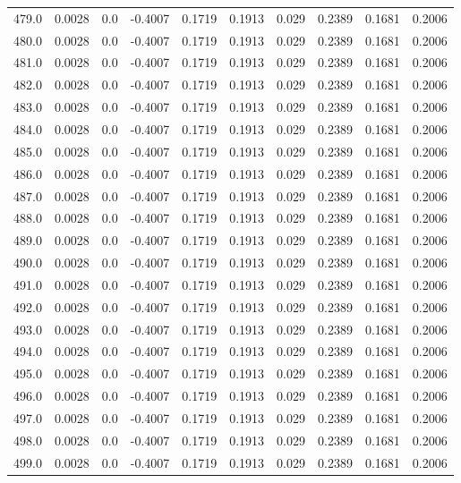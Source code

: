 \begin{longtable}{lrrrrrrrrr}
479.0 & 0.0028 & 0.0 & -0.4007 & 0.1719 & 0.1913 & 0.029 & 0.2389 & 0.1681 & 0.2006 \\
480.0 & 0.0028 & 0.0 & -0.4007 & 0.1719 & 0.1913 & 0.029 & 0.2389 & 0.1681 & 0.2006 \\
481.0 & 0.0028 & 0.0 & -0.4007 & 0.1719 & 0.1913 & 0.029 & 0.2389 & 0.1681 & 0.2006 \\
482.0 & 0.0028 & 0.0 & -0.4007 & 0.1719 & 0.1913 & 0.029 & 0.2389 & 0.1681 & 0.2006 \\
483.0 & 0.0028 & 0.0 & -0.4007 & 0.1719 & 0.1913 & 0.029 & 0.2389 & 0.1681 & 0.2006 \\
484.0 & 0.0028 & 0.0 & -0.4007 & 0.1719 & 0.1913 & 0.029 & 0.2389 & 0.1681 & 0.2006 \\
485.0 & 0.0028 & 0.0 & -0.4007 & 0.1719 & 0.1913 & 0.029 & 0.2389 & 0.1681 & 0.2006 \\
486.0 & 0.0028 & 0.0 & -0.4007 & 0.1719 & 0.1913 & 0.029 & 0.2389 & 0.1681 & 0.2006 \\
487.0 & 0.0028 & 0.0 & -0.4007 & 0.1719 & 0.1913 & 0.029 & 0.2389 & 0.1681 & 0.2006 \\
488.0 & 0.0028 & 0.0 & -0.4007 & 0.1719 & 0.1913 & 0.029 & 0.2389 & 0.1681 & 0.2006 \\
489.0 & 0.0028 & 0.0 & -0.4007 & 0.1719 & 0.1913 & 0.029 & 0.2389 & 0.1681 & 0.2006 \\
490.0 & 0.0028 & 0.0 & -0.4007 & 0.1719 & 0.1913 & 0.029 & 0.2389 & 0.1681 & 0.2006 \\
491.0 & 0.0028 & 0.0 & -0.4007 & 0.1719 & 0.1913 & 0.029 & 0.2389 & 0.1681 & 0.2006 \\
492.0 & 0.0028 & 0.0 & -0.4007 & 0.1719 & 0.1913 & 0.029 & 0.2389 & 0.1681 & 0.2006 \\
493.0 & 0.0028 & 0.0 & -0.4007 & 0.1719 & 0.1913 & 0.029 & 0.2389 & 0.1681 & 0.2006 \\
494.0 & 0.0028 & 0.0 & -0.4007 & 0.1719 & 0.1913 & 0.029 & 0.2389 & 0.1681 & 0.2006 \\
495.0 & 0.0028 & 0.0 & -0.4007 & 0.1719 & 0.1913 & 0.029 & 0.2389 & 0.1681 & 0.2006 \\
496.0 & 0.0028 & 0.0 & -0.4007 & 0.1719 & 0.1913 & 0.029 & 0.2389 & 0.1681 & 0.2006 \\
497.0 & 0.0028 & 0.0 & -0.4007 & 0.1719 & 0.1913 & 0.029 & 0.2389 & 0.1681 & 0.2006 \\
498.0 & 0.0028 & 0.0 & -0.4007 & 0.1719 & 0.1913 & 0.029 & 0.2389 & 0.1681 & 0.2006 \\
499.0 & 0.0028 & 0.0 & -0.4007 & 0.1719 & 0.1913 & 0.029 & 0.2389 & 0.1681 & 0.2006 \\

\end{longtable}
